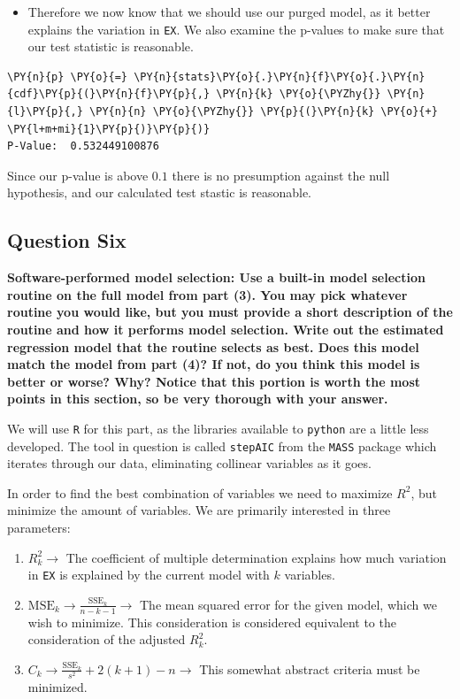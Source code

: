 \documentclass[10pt]{article}\usepackage[]{graphicx}\usepackage[]{xcolor}
\begin{document}
    \begin{itemize}
\itemsep1pt\parskip0pt
\item
  Therefore we now know that we should use our purged model, as it better explains the variation in \texttt{EX}. We also
  examine the p-values to make sure that our test statistic is reasonable.
\end{itemize}

    \begin{Verbatim}[commandchars=\\\{\}]
\PY{n}{p} \PY{o}{=} \PY{n}{stats}\PY{o}{.}\PY{n}{f}\PY{o}{.}\PY{n}{cdf}\PY{p}{(}\PY{n}{f}\PY{p}{,} \PY{n}{k} \PY{o}{\PYZhy{}} \PY{n}{l}\PY{p}{,} \PY{n}{n} \PY{o}{\PYZhy{}} \PY{p}{(}\PY{n}{k} \PY{o}{+} \PY{l+m+mi}{1}\PY{p}{)}\PY{p}{)}
P-Value:  0.532449100876
\end{Verbatim}

    Since our p-value is above $0.1$ there is no presumption against the
null hypothesis, and our calculated test stastic is reasonable.

    \subsection*{Question Six}
    \textbf{Software-performed model selection: Use a built-in model selection routine on the full model from part (3).
    You may pick whatever routine you would like, but you must provide a short description of the routine and how it
    performs model selection. Write out the estimated regression model that the routine selects as best. Does this
    model match the model from part (4)? If not, do you think this model is better or worse? Why? Notice that this
    portion is worth the most points in this section, so be very thorough with your answer.}\newline


    We will use \texttt{R} for this part, as the libraries available to \texttt{python} are a little less developed. The
    tool in question is called \texttt{stepAIC} from the \texttt{MASS} package which iterates through our data,
    eliminating collinear variables as it goes.

    In order to find the best combination of variables we need to maximize $R^2$, but minimize the amount of variables.
    We are primarily interested in three parameters:

\begin{enumerate}
\def\labelenumi{\arabic{enumi}.}
\itemsep1pt\parskip0pt
\item
  $R^2_k \to$ The coefficient of multiple determination explains how
  much variation in \texttt{EX} is explained by the current model with
  $k$ variables.
\item
  $\text{MSE}_k \to \frac{\text{SSE}_k}{n - k - 1} \to$ The mean squared
  error for the given model, which we wish to minimize. This
  consideration is considered equivalent to the consideration of the
  adjusted $R^2_k$.
\item
  $C_k \to \frac{\text{SSE}_k}{s^2} + 2(k + 1) - n \to$ This somewhat
  abstract criteria must be minimized.
\end{enumerate}
\end{document}
